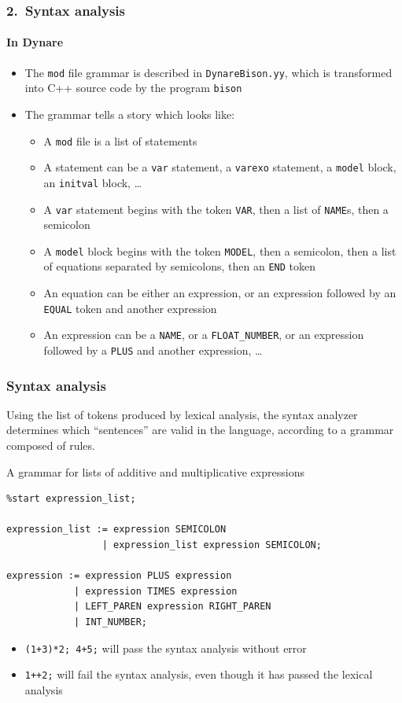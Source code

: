 \documentclass[aspectratio=169]{beamer}
\begin{document}
\begin{frame}
\frametitle{2.\ Syntax analysis}
\framesubtitle{In Dynare}
\begin{itemize}
\item The \texttt{mod} file grammar is described in \texttt{DynareBison.yy}, which is transformed into C++ source code by the program \texttt{bison}
\item The grammar tells a story which looks like:
  \begin{itemize}
  \item A \texttt{mod} file is a list of statements
  \item A statement can be a \texttt{var} statement, a \texttt{varexo} statement, a \texttt{model} block, an \texttt{initval} block, \ldots
  \item A \texttt{var} statement begins with the token \texttt{VAR}, then a list of \texttt{NAME}s, then a semicolon
  \item A \texttt{model} block begins with the token \texttt{MODEL}, then a semicolon, then a list of equations separated by semicolons, then an \texttt{END} token
  \item An equation can be either an expression, or an expression followed by an \texttt{EQUAL} token and another expression
  \item An expression can be a \texttt{NAME}, or a \texttt{FLOAT\_NUMBER}, or an expression followed by a \texttt{PLUS} and another expression, \ldots
  \end{itemize}
\end{itemize}
\end{frame}

\begin{frame}[fragile]
\frametitle{Syntax analysis}
Using the list of tokens produced by lexical analysis, the syntax analyzer determines which ``sentences'' are valid in the language, according to a \alert{grammar} composed of \alert{rules}.
\begin{block}{A grammar for lists of additive and multiplicative expressions}
\begin{footnotesize}
\begin{verbatim}
%start expression_list;

expression_list := expression SEMICOLON
                 | expression_list expression SEMICOLON;

expression := expression PLUS expression
            | expression TIMES expression
            | LEFT_PAREN expression RIGHT_PAREN
            | INT_NUMBER;
\end{verbatim}
\end{footnotesize}
\end{block}
\begin{itemize}
\item \texttt{(1+3)*2; 4+5;} will pass the syntax analysis without error
\item \texttt{1++2;} will fail the syntax analysis, even though it has passed the lexical analysis
\end{itemize}
\end{frame}
\end{document}
